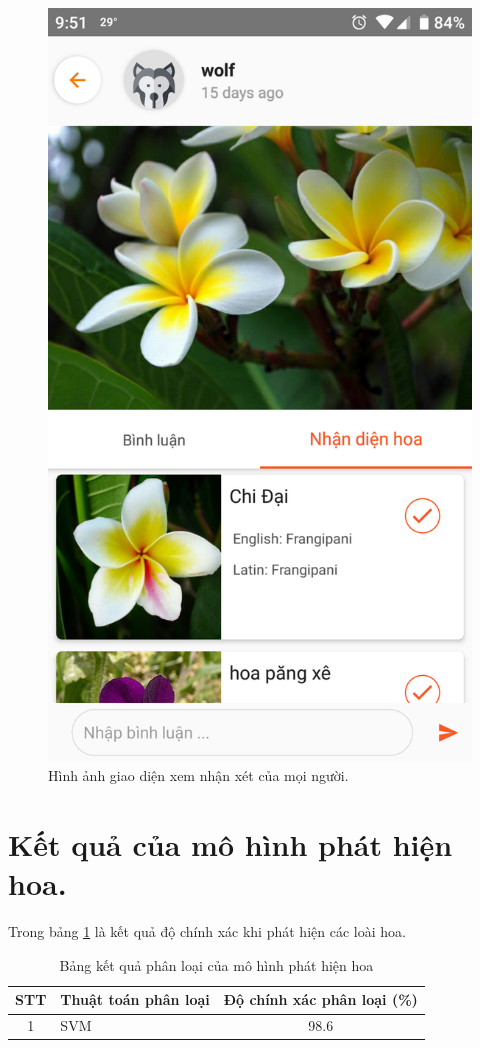 \documentclass[12pt]{report}
\begin{document}
\begin{figure}[h]
			\includegraphics[scale=0.2]{app_comment2}
			\caption{Hình ảnh giao diện xem nhận xét của mọi người.}
			\label{fig:app_comment}
		\end{figure}\newpage
				
		
		\section{Kết quả của mô hình phát hiện hoa.}
		Trong bảng \ref{tbl:table ket qua detect flower} là kết quả độ chính xác khi phát hiện các loài hoa.
		\begin{table}[h]
			\centering
			\caption{Bảng kết quả phân loại của mô hình phát hiện hoa}
			\label{tbl:table ket qua detect flower}
			\begin{tabular}{|c|l|c|}
				\hline
				\textbf{STT} & \textbf{Thuật toán phân loại} & \textbf{Độ chính xác phân loại (\%)} \\ \hline
				1            & SVM                                 & 98.6                                         \\ \hline   			
			\end{tabular}
		\end{table}
\end{document}
